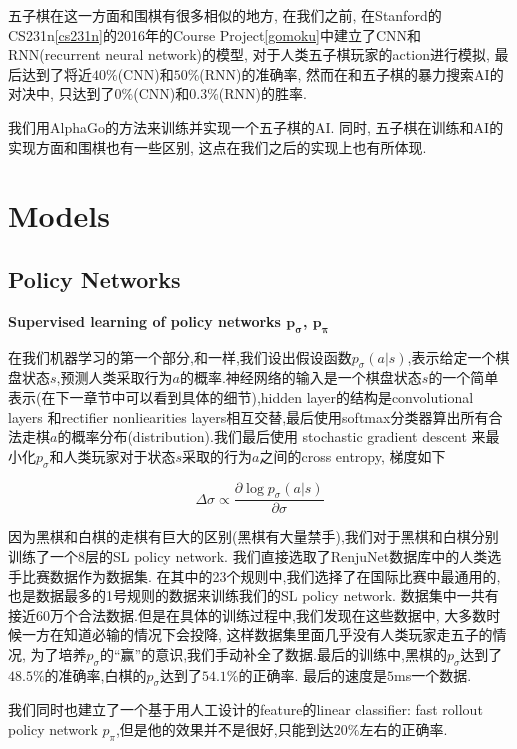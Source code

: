 \documentclass[twocolumn]{article}
\begin{document}
五子棋在这一方面和围棋有很多相似的地方, 在我们之前, 在Stanford的CS231n\ref{cs231n}的2016年的Course Project\ref{gomoku}中建立了CNN和RNN(recurrent neural network)的模型, 对于人类五子棋玩家的action进行模拟, 最后达到了将近$40\%$(CNN)和$50\%$(RNN)的准确率, 然而在和五子棋的暴力搜索AI的对决中, 只达到了$0\%$(CNN)和$0.3\%$(RNN)的胜率.

我们用AlphaGo的方法来训练并实现一个五子棋的AI. 同时, 五子棋在训练和AI的实现方面和围棋也有一些区别, 这点在我们之后的实现上也有所体现.

\section{Models}

\subsection{Policy Networks}

\noindent \textbf{Supervised learning of policy networks $\bm{p_\sigma}$, $\bm{p_\pi}$}

在我们机器学习的第一个部分,和\cite{alphago}一样,我们设出假设函数$p_\sigma(a|s)$,表示给定一个棋盘状态$s$,预测人类采取行为$a$的概率.神经网络的输入是一个棋盘状态$s$的一个简单表示(在下一章节中可以看到具体的细节),hidden layer的结构是convolutional layers 和rectifier nonliearities layers相互交替,最后使用softmax分类器算出所有合法走棋$a$的概率分布(distribution).我们最后使用 stochastic gradient descent 来最小化$p_\sigma$和人类玩家对于状态$s$采取的行为$a$之间的cross entropy, 梯度如下

\[
\Delta\sigma \propto \frac{\partial\log p_\sigma(a|s)}{\partial \sigma}
\]

因为黑棋和白棋的走棋有巨大的区别(黑棋有大量禁手),我们对于黑棋和白棋分别训练了一个$8$层的SL policy network. 我们直接选取了RenjuNet\cite{renjunet}数据库中的人类选手比赛数据作为数据集. 在其中的23个规则中,我们选择了在国际比赛中最通用的,也是数据最多的1号规则的数据来训练我们的SL policy network. 数据集中一共有接近60万个合法数据.但是在具体的训练过程中,我们发现在这些数据中, 大多数时候一方在知道必输的情况下会投降, 这样数据集里面几乎没有人类玩家走五子的情况, 为了培养$p_\sigma$的“赢”的意识,我们手动补全了数据.最后的训练中,黑棋的$p_\sigma$达到了$48.5\%$的准确率,白棋的$p_\sigma$达到了$54.1\%$的正确率. 最后的速度是$5$ms一个数据.

我们同时也建立了一个基于用人工设计的feature的linear classifier: fast rollout policy network $p_\pi$,但是他的效果并不是很好,只能到达$20\%$左右的正确率.
\end{document}

